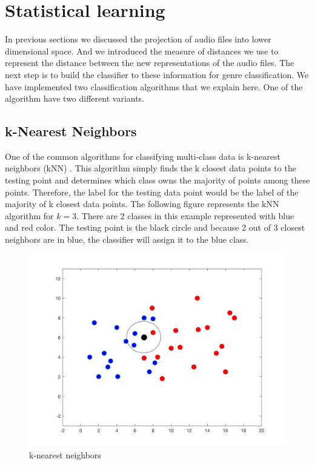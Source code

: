 \documentclass[12pt]{article}
\begin{document}
\section{Statistical learning}\label{sec:stat}
In previous sections we discussed the projection of audio files into lower dimensional space. And we introduced the measure of distances we use to represent the distance between the new representations of the audio files. The next step is to build the classifier to these information for genre classification. We have implemented two classification algorithms that we explain here. One of the algorithm have two different variants.
\subsection{k-Nearest Neighbors}
One of the common algorithms for classifying multi-class data is k-nearest neighbors (kNN) \cite{li}. This algorithm simply finds the k closest data points to the testing point and determines which class owns the majority of points among these points. Therefore, the label for the testing data point would be the label of the majority of k closest data points.
The following figure represents the kNN algorithm for $k = 3$. There are 2 classes in this example represented with blue and red color. The testing point is the black circle and because 2 out of 3 closest neighbors are in blue, the classifier will assign it to the blue class.
\begin{figure}[H]\label{kNN}
	\centering
	\includegraphics[width=.8\linewidth]{kNN.jpg}
	\caption{k-nearest neighbors}
\end{figure}
\end{document}
